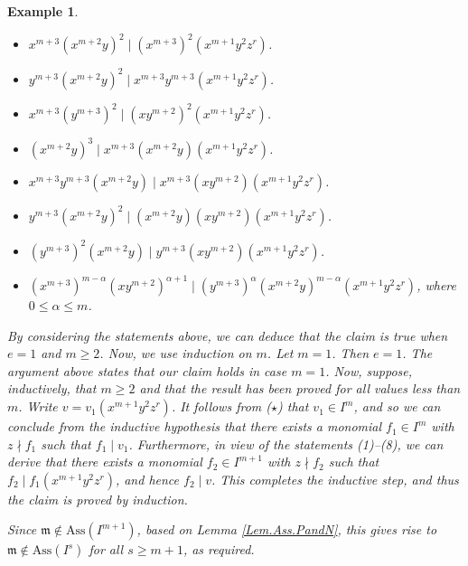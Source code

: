 \documentclass[11pt]{amsart}
\newtheorem{example}[theorem]{Example}
\begin{document}
\begin{example}
{  \begin{itemize}
\item[(1)]  $x^{m+3}(x^{m+2}y)^2 \mid (x^{m+3})^{2} (x^{m+1}y^2z^r)$. 
\item[(2)]  $y^{m+3}(x^{m+2}y)^2 \mid x^{m+3} y^{m+3} (x^{m+1}y^2z^r)$. 
\item[(3)]   $x^{m+3} (y^{m+3})^2 \mid (xy^{m+2})^2(x^{m+1}y^2z^r)$.
\item[(4)]   $(x^{m+2}y)^3 \mid x^{m+3}(x^{m+2}y)(x^{m+1}y^2z^r)$.
\item[(5)]  $x^{m+3} y^{m+3}(x^{m+2}y)  \mid  x^{m+3}(xy^{m+2})(x^{m+1}y^2z^r)$.
\item[(6)]  $y^{m+3}(x^{m+2}y)^2 \mid (x^{m+2}y)(xy^{m+2})(x^{m+1}y^2z^r)$.
\item[(7)]  $(y^{m+3})^2 (x^{m+2}y) \mid y^{m+3}(xy^{m+2})(x^{m+1}y^2z^r)$.
\item[(8)]  $(x^{m+3})^{m-\alpha} (xy^{m+2})^{\alpha +1} \mid (y^{m+3})^{\alpha} (x^{m+2}y)^{m-\alpha} (x^{m+1}y^2z^r)$,  where \\
  $0\leq \alpha \leq m$. 
\end{itemize}
 By considering the statements above,  we can  deduce that the claim is true when $e=1$ and $m\geq 2$. 
 Now, we use induction on $m$. Let $m=1$. Then $e=1$.  The argument above states that our claim holds in case $m=1$.  Now, suppose, inductively, that $m\geq 2$ and that the result has been proved for all values  less than $m$. Write $v=v_1(x^{m+1}y^2z^r)$. It follows from ($\star$) that 
  $v_1 \in I^m$, and so  we can conclude from  the inductive hypothesis that there exists a monomial $f_1\in I^{m}$ with  $z \nmid f_1$ such that $f_1\mid v_1$.    Furthermore,  in view of  the  statements (1)--(8), we can derive that  there exists a monomial $f_2\in I^{m+1}$ with  $z \nmid f_2$ such that $f_2 \mid f_1(x^{m+1}y^2z^r)$, and hence $f_2 \mid v$.   This completes the inductive step, and thus the claim  is  proved by induction.  
  
  Since $\mathfrak{m} \notin \mathrm{Ass}(I^{m+1})$,  based on  Lemma \ref{Lem.Ass.PandN}, this gives rise to   
  $\mathfrak{m} \notin \mathrm{Ass}(I^s)$  for all $s\geq m+1$, as required. 
}
\end{example}
 
 
 
 
 
\end{document}
